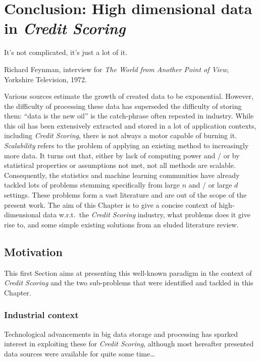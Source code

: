 \chapter*{Conclusion: High dimensional data in \textit{Credit Scoring}} \label{ccl}


\epigraph{It's not complicated, it's just a lot of it.}{Richard Feynman, interview for \textit{The World from Another Point of View}, Yorkshire Television, 1972.}

\minitoc

Various sources estimate the growth of created data to be exponential. However, the difficulty of processing these data has superseded the difficulty of storing them: ``data is the new oil'' is the catch-phrase often repeated in industry. While this oil has been extensively extracted and stored in a lot of application contexts, including \textit{Credit Scoring}, there is not always a motor capable of burning it. \textit{Scalability} refers to the problem of applying an existing method to increasingly more data. It turns out that, either by lack of computing power and / or by statistical properties or assumptions not met, not all methods are scalable.
Consequently, the statistics and machine learning communities have already tackled lots of problems stemming specifically from large $n$ and / or large $d$ settings.
These problems form a vast literature and are out of the scope of the present work.
The aim of this Chapter is to give a concise context of high-dimensional data w.r.t.\ the \textit{Credit Scoring} industry, what problems does it give rise to, and some simple existing solutions from an eluded literature review.

\section{Motivation}

This first Section aims at presenting this well-known paradigm in the context of \textit{Credit Scoring} and the two sub-problems that were identified and tackled in this Chapter.

\subsection{Industrial context}

Technological advancements in big data storage and processing has sparked interest in exploiting these for \textit{Credit Scoring}, although most hereafter presented data sources were available for quite some time\dots

